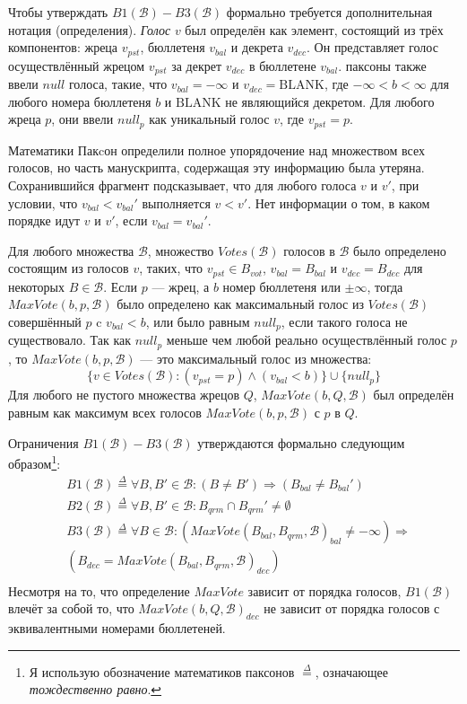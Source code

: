 \documentclass[12pt, a4paper]{article} %
\begin{document}
Чтобы утверждать $B1(\mathcal{B}) - B3(\mathcal{B})$ формально требуется дополнительная нотация (определения). \textit{Голос} $v$ был определён как элемент, состоящий из трёх компонентов: жреца $v_{pst}$, бюллетеня $v_{bal}$ и декрета $v_{dec}$. Он представляет голос осуществлённый жрецом $v_{pst}$ за декрет $v_{dec}$ в бюллетене $v_{bal}$. паксоны также ввели $null$ голоса, такие, что $v_{bal}=-\infty$ и $v_{dec}=\mathrm{BLANK}$, где $-\infty < b < \infty$ для любого номера бюллетеня $b$ и $\mathrm{BLANK}$ не являющийся декретом. Для любого жреца $p$, они ввели $null_p$ как уникальный голос $v$, где $v_{pst}=p$.

Математики Пакcон определили полное упорядочение над множеством всех голосов, но часть манускрипта, содержащая эту информацию была утеряна. Сохранившийся фрагмент подсказывает, что для любого голоса $v$ и $v'$, при условии, что $v_{bal} < v_{bal}'$ выполняется $v < v'$. Нет информации о том, в каком порядке идут $v$ и $v'$, если $v_{bal} = v_{bal}'$.

Для любого множества $\mathcal{B}$, множество $Votes(\mathcal{B})$ голосов в $\mathcal{B}$ было определено состоящим из голосов $v$, таких, что $v_{pst} \in B_{vot}$, $v_{bal} = B_{bal}$ и $v_{dec} = B_{dec}$ для некоторых $B \in \mathcal{B}$. Если $p$ --- жрец, а $b$ номер бюллетеня или $\pm \infty$, тогда $MaxVote(b, p, \mathcal{B})$ было определено как максимальный голос из $Votes(\mathcal{B})$ совершённый $p$ c $v_{bal} < b$, или было равным $null_p$, если такого голоса не существовало. Так как $null_p$ меньше чем любой реально осуществлённый голос $p$, то $MaxVote(b,p, \mathcal{B})$ --- это максимальный голос из множества:
\[  
    \{v \in Votes(\mathcal{B}) : (v_{pst} = p) \land (v_{bal} < b)\} \cup \{null_p\}
\]
Для любого не пустого множества жрецов $Q$, $MaxVote(b, Q, \mathcal{B})$ был определён равным как максимум всех голосов $MaxVote(b, p, \mathcal{B})$ с $p$ в $Q$.

Ограничения  $B1(\mathcal{B}) - B3(\mathcal{B})$ утверждаются формально следующим образом\footnote{Я использую обозначение математиков паксонов $\overset{\Delta}{=}$, означающее \textit{тождественно равно}.}:
\begin{align*}
    &B1(\mathcal{B}) \overset{\Delta}{=} \forall B, B' \in \mathcal{B} : (B \neq B') \Rightarrow (B_{bal} \neq B_{bal}') \\
    &B2(\mathcal{B}) \overset{\Delta}{=} \forall B, B' \in \mathcal{B} : B_{qrm} \cap B_{qrm}' \neq \emptyset \\
    &B3(\mathcal{B}) \overset{\Delta}{=} \forall B \in \mathcal{B} : (MaxVote(B_{bal}, B_{qrm}, \mathcal{B})_{bal} \neq - \infty) \Rightarrow \\
    &(B_{dec} = MaxVote(B_{bal}, B_{qrm}, \mathcal{B})_{dec}) \\
\end{align*}
Несмотря на то, что определение $MaxVote$ зависит от порядка голосов, $B1(\mathcal{B})$ влечёт за собой то, что $MaxVote(b, Q, \mathcal{B})_{dec}$ не зависит от порядка голосов с эквивалентными номерами бюллетеней.
\end{document}
